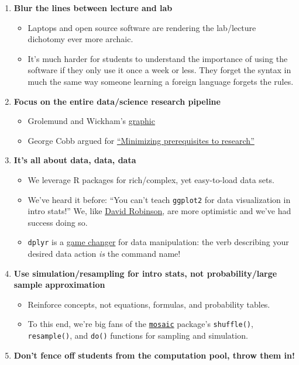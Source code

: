 \documentclass[]{tufte-book}
\providecommand{\tightlist}{%
  \setlength{\itemsep}{0pt}\setlength{\parskip}{0pt}}
\theoremstyle{definition}
\theoremstyle{definition}
\theoremstyle{remark}
\begin{document}
\begin{enumerate}
\def\labelenumi{\arabic{enumi}.}
\tightlist
\item
  \textbf{Blur the lines between lecture and lab}

  \begin{itemize}
  \tightlist
  \item
    Laptops and open source software are rendering the lab/lecture
    dichotomy ever more archaic.
  \item
    It's much harder for students to understand the importance of using
    the software if they only use it once a week or less. They forget
    the syntax in much the same way someone learning a foreign language
    forgets the rules.
  \end{itemize}
\item
  \textbf{Focus on the entire data/science research pipeline}

  \begin{itemize}
  \tightlist
  \item
    Grolemund and Wickham's
    \href{http://r4ds.had.co.nz/introduction.html}{graphic}
  \item
    George Cobb argued for
    \href{https://arxiv.org/abs/1507.05346}{``Minimizing prerequisites
    to research''}
  \end{itemize}
\item
  \textbf{It's all about data, data, data}

  \begin{itemize}
  \tightlist
  \item
    We leverage R packages for rich/complex, yet easy-to-load data sets.
  \item
    We've heard it before: ``You can't teach \texttt{ggplot2} for data
    visualization in intro stats!'' We, like
    \href{http://varianceexplained.org/r/teach_ggplot2_to_beginners/}{David
    Robinson}, are more optimistic and we've had success doing so.
  \item
    \texttt{dplyr} is a
    \href{http://chance.amstat.org/2015/04/setting-the-stage/}{game
    changer} for data manipulation: the verb describing your desired
    data action \emph{is} the command name!
  \end{itemize}
\item
  \textbf{Use simulation/resampling for intro stats, not
  probability/large sample approximation}

  \begin{itemize}
  \tightlist
  \item
    Reinforce concepts, not equations, formulas, and probability tables.
  \item
    To this end, we're big fans of the
    \href{https://github.com/ProjectMOSAIC/mosaic}{\texttt{mosaic}}
    package's \texttt{shuffle()}, \texttt{resample()}, and \texttt{do()}
    functions for sampling and simulation.
  \end{itemize}
\item
  \textbf{Don't fence off students from the computation pool, throw them
  in!}


\end{enumerate}
\end{document}
